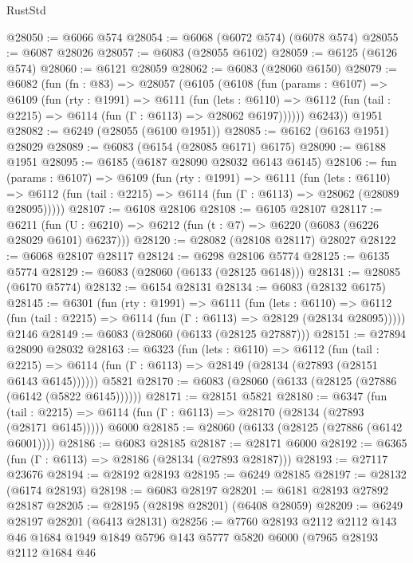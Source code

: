 \begin{lexlean}{RustStd}
\begin{coremodule}
@28050 := @6066 @574
@28054 := @6068 (@6072 @574) (@6078 @574)
@28055 := @6087 @28026
@28057 := @6083 (@28055 @6102)
@28059 := @6125 (@6126 @574)
@28060 := @6121 @28059
@28062 := @6083 (@28060 @6150)
@28079 := @6082
    (fun (fn : @83) =>
    @28057
      (@6105
        (@6108
          (fun (params : @6107) =>
          @6109
            (fun (rty : @1991) =>
            @6111
              (fun (lets : @6110) =>
              @6112 (fun (tail : @2215) => @6114 (fun (Γ : @6113) => @28062 @6197))))))
        @6243))
    @1951
@28082 := @6249 (@28055 (@6100 @1951))
@28085 := @6162 (@6163 @1951) @28029
@28089 := @6083 (@6154 (@28085 @6171) @6175)
@28090 := @6188 @1951
@28095 := @6185 (@6187 @28090 @28032 @6143 @6145)
@28106 := fun (params : @6107) =>
  @6109
    (fun (rty : @1991) =>
    @6111
      (fun (lets : @6110) =>
      @6112 (fun (tail : @2215) => @6114 (fun (Γ : @6113) => @28062 (@28089 @28095)))))
@28107 := @6108 @28106
@28108 := @6105 @28107
@28117 := @6211
    (fun (U : @6210) => @6212 (fun (t : @7) => @6220 (@6083 (@6226 @28029 @6101) @6237)))
@28120 := @28082 (@28108 @28117) @28027
@28122 := @6068 @28107 @28117
@28124 := @6298 @28106 @5774
@28125 := @6135 @5774
@28129 := @6083 (@28060 (@6133 (@28125 @6148)))
@28131 := @28085 (@6170 @5774)
@28132 := @6154 @28131
@28134 := @6083 (@28132 @6175)
@28145 := @6301
    (fun (rty : @1991) =>
    @6111
      (fun (lets : @6110) =>
      @6112 (fun (tail : @2215) => @6114 (fun (Γ : @6113) => @28129 (@28134 @28095)))))
    @2146
@28149 := @6083 (@28060 (@6133 (@28125 @27887)))
@28151 := @27894 @28090 @28032
@28163 := @6323
    (fun (lets : @6110) =>
    @6112
      (fun (tail : @2215) =>
      @6114 (fun (Γ : @6113) => @28149 (@28134 (@27893 (@28151 @6143 @6145))))))
    @5821
@28170 := @6083 (@28060 (@6133 (@28125 (@27886 (@6142 (@5822 @6145))))))
@28171 := @28151 @5821
@28180 := @6347
    (fun (tail : @2215) => @6114 (fun (Γ : @6113) => @28170 (@28134 (@27893 (@28171 @6145)))))
    @6000
@28185 := @28060 (@6133 (@28125 (@27886 (@6142 @6001))))
@28186 := @6083 @28185
@28187 := @28171 @6000
@28192 := @6365 (fun (Γ : @6113) => @28186 (@28134 (@27893 @28187)))
@28193 := @27117 @23676
@28194 := @28192 @28193
@28195 := @6249 @28185
@28197 := @28132 (@6174 @28193)
@28198 := @6083 @28197
@28201 := @6181 @28193 @27892 @28187
@28205 := @28195 (@28198 @28201) (@6408 @28059)
@28209 := @6249 @28197 @28201 (@6413 @28131)
@28256 := @7760
    @28193
    @2112
    @2112
    @143
    @46
    @1684
    @1949
    @1849
    @5796
    @143
    @5777
    @5820
    @6000
    (@7965
      @28193
      @2112
      @1684
      @46

\end{coremodule}
\end{lexlean}
